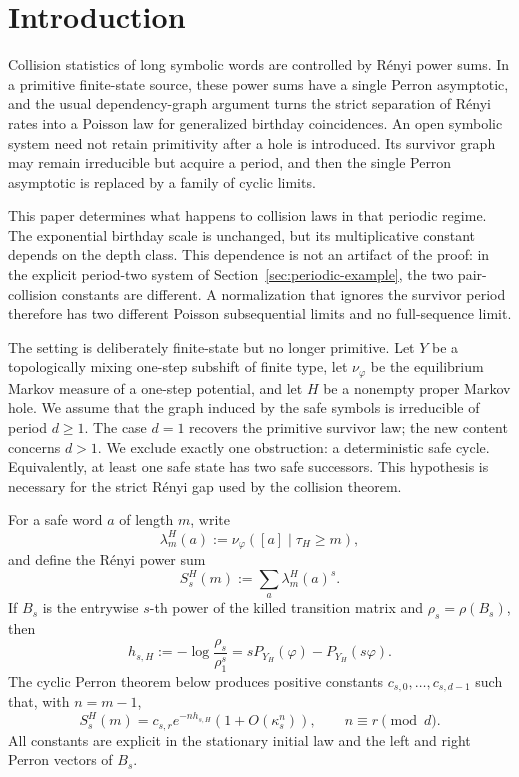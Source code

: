 \section{Introduction}\label{sec:introduction}

Collision statistics of long symbolic words are controlled by R\'enyi
power sums.  In a primitive finite-state source, these power sums have a
single Perron asymptotic, and the usual dependency-graph argument turns
the strict separation of R\'enyi rates into a Poisson law for generalized
birthday coincidences.  An open symbolic system need not retain
primitivity after a hole is introduced.  Its survivor graph may remain
irreducible but acquire a period, and then the single Perron asymptotic
is replaced by a family of cyclic limits.

This paper determines what happens to collision laws in that periodic
regime.  The exponential birthday scale is unchanged, but its
multiplicative constant depends on the depth class.  This dependence is
not an artifact of the proof: in the explicit period-two system of
Section~\ref{sec:periodic-example}, the two pair-collision constants are
different.  A normalization that ignores the survivor period therefore
has two different Poisson subsequential limits and no full-sequence
limit.

The setting is deliberately finite-state but no longer primitive.  Let
\(Y\) be a topologically mixing one-step subshift of finite type, let
\(\nu_\varphi\) be the equilibrium Markov measure of a one-step
potential, and let \(H\) be a nonempty proper Markov hole.  We assume
that the graph induced by the safe symbols is irreducible of period
\(d\geq1\).  The case \(d=1\) recovers the primitive survivor law; the
new content concerns \(d>1\).  We exclude exactly one obstruction: a
deterministic safe cycle.  Equivalently, at least one safe state has two
safe successors.  This hypothesis is necessary for the strict R\'enyi
gap used by the collision theorem.

For a safe word \(a\) of length \(m\), write
\[
  \lambda_m^H(a)
  :=\nu_\varphi([a]\mid \tau_H\geq m),
\]
and define the R\'enyi power sum
\[
  S_s^H(m):=\sum_a\lambda_m^H(a)^s.
\]
If \(B_s\) is the entrywise \(s\)-th power of the killed transition
matrix and \(\rho_s=\rho(B_s)\), then
\[
  h_{s,H}:=-\log\frac{\rho_s}{\rho_1^s}
  =sP_{Y_H}(\varphi)-P_{Y_H}(s\varphi).
\]
The cyclic Perron theorem below produces positive constants
\(c_{s,0},\ldots,c_{s,d-1}\) such that, with \(n=m-1\),
\[
  S_s^H(m)
  =c_{s,r}e^{-nh_{s,H}}(1+O(\kappa_s^n)),
  \qquad n\equiv r\pmod d.
\]
All constants are explicit in the stationary initial law and the left
and right Perron vectors of \(B_s\).

